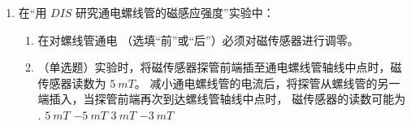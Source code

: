 \begin{enumerate}
\begin{enumerate}
\end{enumerate}




\item 
{}
在“用 $ DIS $ 研究通电螺线管的磁感应强度”实验中：
\begin{enumerate}
\item
在对螺线管通电 \underlinegap （选填“前”或“后”）必须对磁传感器进行调零。
\item 
（单选题）实验时，将磁传感器探管前端插至通电螺线管轴线中点时，磁传感器读数为 $ 5 \ m T $。
减小通电螺线管的电流后，将探管从螺线管的另一端插入，当探管前端再次到达螺线管轴线中点时，
磁传感器的读数可能为 \underlinegap .
\fourchoices
{$ 5 \ m T $}
{$ -5 \ m T $}
{$ 3 \ m T $}
{$ -3 \ m T $}



\end{enumerate}





\end{enumerate}
